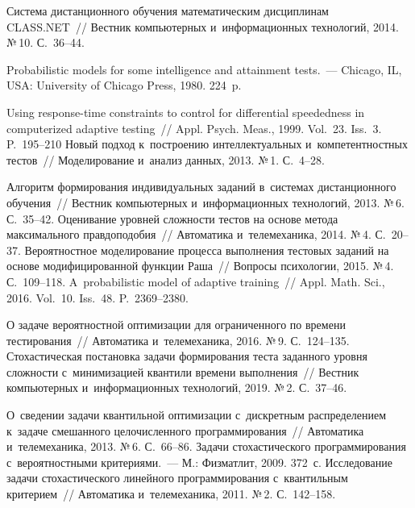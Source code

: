 \begin{multicols}{2}
{\small\frenchspacing
 {%
 \begin{thebibliography}{99}
 Система дистанционного обучения 
математическим дисциплинам CLASS.NET~// Вестник компьютерных и~информационных технологий, 2014. 
№\,10. С.~36--44.

 Probabilistic models for some intelligence and attainment tests.~--- 
Chicago, IL, USA: 
University of Chicago Press, 1980. 224~p.

 Using response-time 
constraints to control for differential speededness in computerized adaptive 
testing~// Appl. Psych. Meas., 1999. Vol.~23. Iss.~3. P.~195--210
 Новый подход 
к~построению интеллектуальных и~компетентностных тестов~// Моделирование и~анализ 
данных, 2013. №\,1. С.~4--28.

 Алгоритм формирования индивидуальных заданий 
в~системах дистанционного обучения~// Вестник компьютерных и~информационных
 технологий, 2013. №\,6. С.~35--42.
 Оценивание уровней сложности тестов на основе 
метода максимального правдоподобия~// Автоматика и~телемеханика, 2014. №\,4. С.~20--37.
Вероятностное моделирование процесса выполнения тестовых заданий на основе 
модифицированной функции Раша~// Вопросы психологии, 2015. №\,4. С.~109--118.
 A~probabilistic model of adaptive training~// Appl. Math. Sci., 2016. 
Vol.~10. Iss.~48. P.~2369--2380.


 О задаче вероятностной оптимизации для 
ограниченного по времени тестирования~// Автоматика и~телемеханика, 2016. №\,9.  
С.~124--135.
 Стохастическая постановка задачи 
формирования теста заданного уровня сложности с~минимизацией квантили времени 
выполнения~// Вестник компьютерных и~информационных технологий, 2019. №\,2. С.~37--46.

 О~сведении задачи квантильной 
оптимизации с~дискретным распределением к~задаче смешанного целочисленного 
программирования~// Автоматика и~телемеханика, 2013. №\,6. С.~66--86.
 Задачи стохастического программирования с~вероятностными 
критериями.~--- М.: Физматлит, 2009. 372~с.
 Исследование задачи стохастического линейного 
программирования с~квантильным критерием~// Автоматика и~телемеханика, 2011. №\,2. 
С.~142--158. 
 \end{thebibliography}

}}
\end{multicols}
